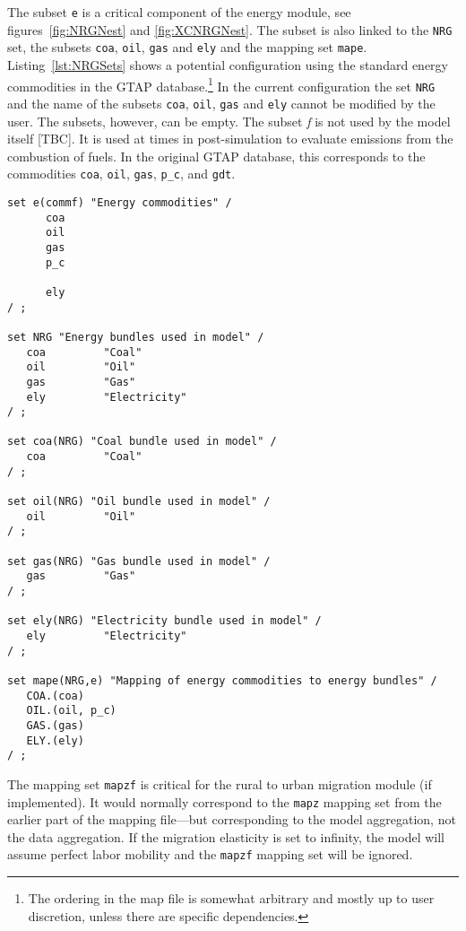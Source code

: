 The subset \texttt{e} is a critical component of the energy module, see
figures~\ref{fig:NRGNest} and \ref{fig:XCNRGNest}. The subset is also linked to
the \texttt{NRG} set, the subsets \texttt{coa}, \texttt{oil}, \texttt{gas} and
\texttt{ely} and the mapping set \texttt{mape}. Listing~\ref{lst:NRGSets} shows
a potential configuration using the standard energy commodities in the GTAP
database.\footnote{The ordering in the map file is somewhat arbitrary and mostly
up to user discretion, unless there are specific dependencies.} In the current
configuration the set \texttt{NRG} and the name of the subsets \texttt{coa},
\texttt{oil}, \texttt{gas} and \texttt{ely} cannot be modified by the user. The
subsets, however, can be empty. The subset \emph{f} is not used by the model
itself [TBC]. It is used at times in post-simulation to evaluate \COT{}
emissions from the combustion of fuels. In the original GTAP database, this
corresponds to the commodities \texttt{coa}, \texttt{oil}, \texttt{gas},
\texttt{p\_c}, and \texttt{gdt}.

\begin{lstlisting}[language=GAMS,
   caption={An energy bundle example}, label=lst:NRGSets]
set e(commf) "Energy commodities" /
      coa
      oil
      gas
      p_c

      ely
/ ;

set NRG "Energy bundles used in model" /
   coa         "Coal"
   oil         "Oil"
   gas         "Gas"
   ely         "Electricity"
/ ;

set coa(NRG) "Coal bundle used in model" /
   coa         "Coal"
/ ;

set oil(NRG) "Oil bundle used in model" /
   oil         "Oil"
/ ;

set gas(NRG) "Gas bundle used in model" /
   gas         "Gas"
/ ;

set ely(NRG) "Electricity bundle used in model" /
   ely         "Electricity"
/ ;

set mape(NRG,e) "Mapping of energy commodities to energy bundles" /
   COA.(coa)
   OIL.(oil, p_c)
   GAS.(gas)
   ELY.(ely)
/ ;
\end{lstlisting}

The mapping set \texttt{mapzf} is critical for the rural to urban migration
module (if implemented). It would normally correspond to the \texttt{mapz}
mapping set from the earlier part of the mapping file---but corresponding to the
model aggregation, not the data aggregation. If the migration elasticity is set
to infinity, the model will assume perfect labor mobility and the \texttt{mapzf}
mapping set will be ignored.

